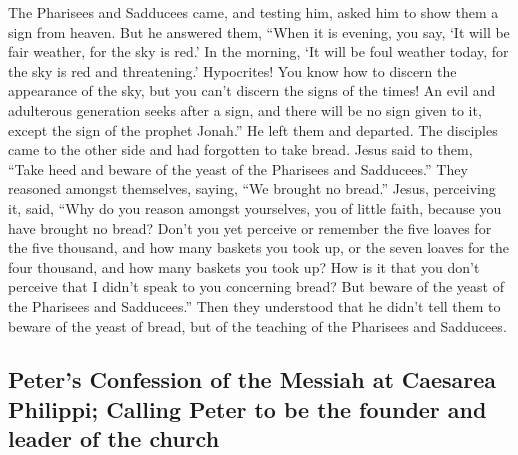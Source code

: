  The Pharisees and Sadducees came, and testing him, asked
him to show them a sign from heaven.  But he answered
them, ``When it is evening, you say, `It will be fair weather, for the
sky is red.'  In the morning, `It will be foul weather
today, for the sky is red and threatening.' Hypocrites! You know how to
discern the appearance of the sky, but you can't discern the signs of
the times!  An evil and adulterous generation seeks after
a sign, and there will be no sign given to it, except the sign of the
prophet Jonah.'' He left them and departed.  The disciples
came to the other side and had forgotten to take bread. 
Jesus said to them, ``Take heed and beware of the yeast of the Pharisees
and Sadducees.''  They reasoned amongst themselves,
saying, ``We brought no bread.''  Jesus, perceiving it,
said, ``Why do you reason amongst yourselves, you of little faith,
because you have brought no bread?  Don't you yet perceive
or remember the five loaves for the five thousand, and how many baskets
you took up,  or the seven loaves for the four thousand,
and how many baskets you took up?  How is it that you
don't perceive that I didn't speak to you concerning bread? But beware
of the yeast of the Pharisees and Sadducees.''  Then they
understood that he didn't tell them to beware of the yeast of bread, but
of the teaching of the Pharisees and Sadducees.

\hypertarget{peters-confession-of-the-messiah-at-caesarea-philippi-calling-peter-to-be-the-founder-and-leader-of-the-church}{%
\subsection{Peter's Confession of the Messiah at Caesarea Philippi;
Calling Peter to be the founder and leader of the
church}\label{peters-confession-of-the-messiah-at-caesarea-philippi-calling-peter-to-be-the-founder-and-leader-of-the-church}}

